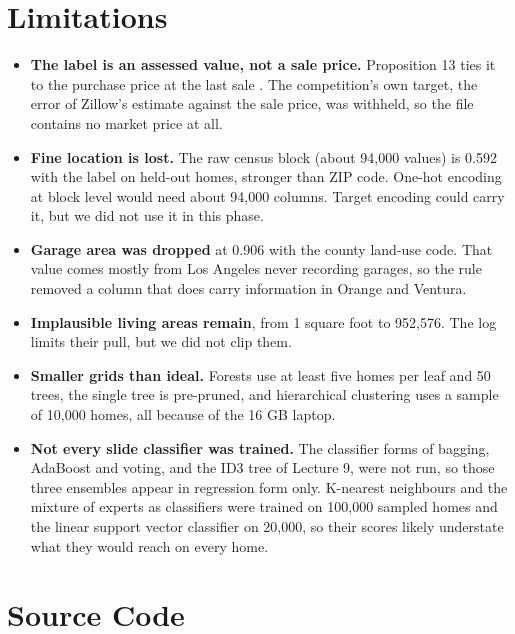 \documentclass[sigconf,nonacm,10pt]{acmart}
\begin{document}
\section{Limitations}
\label{sec:limits}

\begin{itemize}
\item \textbf{The label is an assessed value, not a sale price.} Proposition 13 ties it to the purchase price at the last sale \cite{prop13}. The competition's own target, the error of Zillow's estimate against the sale price, was withheld, so the file contains no market price at all.
\item \textbf{Fine location is lost.} The raw census block (about 94,000 values) is 0.592 with the label on held-out homes, stronger than ZIP code. One-hot encoding at block level would need about 94,000 columns. Target encoding \cite{miccibarreca2001} could carry it, but we did not use it in this phase.
\item \textbf{Garage area was dropped} at 0.906 with the county land-use code. That value comes mostly from Los Angeles never recording garages, so the rule removed a column that does carry information in Orange and Ventura.
\item \textbf{Implausible living areas remain}, from 1 square foot to 952,576. The log limits their pull, but we did not clip them.
\item \textbf{Smaller grids than ideal.} Forests use at least five homes per leaf and 50 trees, the single tree is pre-pruned, and hierarchical clustering uses a sample of 10,000 homes, all because of the 16 GB laptop.
\item \textbf{Not every slide classifier was trained.} The classifier forms of bagging, AdaBoost and voting, and the ID3 tree of Lecture 9, were not run, so those three ensembles appear in regression form only. K-nearest neighbours and the mixture of experts as classifiers were trained on 100,000 sampled homes and the linear support vector classifier on 20,000, so their scores likely understate what they would reach on every home.
\end{itemize}

\section{Source Code}
\label{sec:code}
\end{document}
